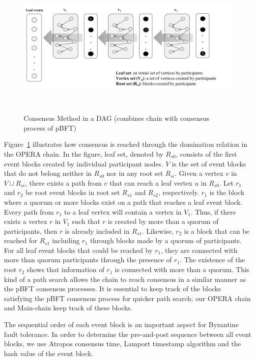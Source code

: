 \documentclass{article}
\begin{document}
\begin{figure}[h] \centering
\includegraphics[height=7cm, width=1.0\columnwidth]{pBFTtoPath}
\caption{Consensus Method in a DAG (combines chain with consensus process of pBFT)}
\label{fig:pBFTtoPath}
\end{figure}
Figure~\ref{fig:pBFTtoPath} illustrates how consensus is reached through the domination relation in the OPERA chain. In the figure, leaf set, denoted by $R_{s0}$, consists of the first event blocks created by individual participant nodes. $V$ is the set of event blocks that do not belong neither in $R_{s0}$ nor in any root set $R_{si}$.
Given a vertex $v$ in $V \cup R_{si}$, there exists a path from $v$ that can reach a leaf vertex $u$ in $R_{s0}$. 
Let $r_1$ and $r_2$ be root event blocks in root set $R_{s1}$ and $R_{s2}$, respectively.
$r_1$ is the block where a quorum or more blocks exist on a path that reaches a leaf event block. 
Every path from $r_1$ to a leaf vertex will contain a vertex in $V_1$. Thus, if there exists a vertex $r$ in $V_1$ such that $r$ is created by more than a quorum of participants, then $r$ is already included in $R_{s1}$. Likewise, $r_2$ is a block that can be reached for $R_{s1}$ including $r_1$ through blocks made by a quorum of participants.
For all leaf event blocks that could be reached by $r_1$, they are connected with more than quorum participants through the presence of $r_1$. The existence of the root $r_2$ shows that information of $r_1$ is connected with more than a quorum. 
This kind of a path search allows the chain to reach consensus in a similar manner as the pBFT consensus processes. It is essential to keep track of the blocks satisfying the pBFT consensus process for quicker path search; our OPERA chain and Main-chain keep track of these blocks.

The sequential order of each event block is an important aspect for Byzantine fault tolerance. In order to determine the pre-and-post sequence between all event blocks, we use Atropos consensus time, Lamport timestamp algorithm and the hash value of the event block.
\end{document}
